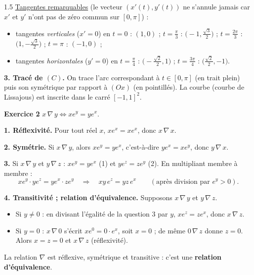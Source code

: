 \documentclass[12pt]{article}
\begin{document}
\begin{spacing}{1.5}
\underline{Tangentes remarquables} (le vecteur $(x'(t),y'(t))$ ne s'annule jamais car $x'$ et $y'$ n'ont pas de zéro commun sur $[0,\pi]$) :
\begin{itemize}
\item tangentes \emph{verticales} ($x'=0$) en $t=0$ : $(1,0)$ ; $t=\frac\pi3$ : $\big(-1,\frac{\sqrt3}2\big)$ ; $t=\frac{2\pi}3$ : $\big(1,-\frac{\sqrt3}2\big)$ ; $t=\pi$ : $(-1,0)$ ;
\item tangentes \emph{horizontales} ($y'=0$) en $t=\frac\pi4$ : $\big(-\frac{\sqrt2}2,1\big)$ ; $t=\frac{3\pi}4$ : $\big(\frac{\sqrt2}2,-1\big)$.
\end{itemize}

\textbf{3. Tracé de $(C)$.} On trace l'arc correspondant à $t\in[0,\pi]$ (en trait plein) puis son symétrique par rapport à $(Ox)$ (en pointillés). La courbe (courbe de Lissajous) est inscrite dans le carré $[-1,1]^2$.
\begin{center}
\end{center}

\medskip\textbf{Exercice 2} \quad $x\,\nabla\,y\iff xe^y=ye^x$.

\textbf{1. Réflexivité.} Pour tout réel $x$, $xe^x=xe^x$, donc $x\,\nabla\,x$.

\textbf{2. Symétrie.} Si $x\,\nabla\,y$, alors $xe^y=ye^x$, c'est-à-dire $ye^x=xe^y$, donc $y\,\nabla\,x$.

\textbf{3.} Si $x\,\nabla\,y$ et $y\,\nabla\,z$ : $xe^y=ye^x$ (1) et $ye^z=ze^y$ (2). En multipliant membre à membre :
\[
xe^y\cdot ye^z=ye^x\cdot ze^y\quad\Longrightarrow\quad xy\,e^z=yz\,e^x\qquad(\text{après division par } e^y>0).
\]

\textbf{4. Transitivité ; relation d'équivalence.} Supposons $x\,\nabla\,y$ et $y\,\nabla\,z$.
\begin{itemize}
\item Si $y\neq0$ : en divisant l'égalité de la question 3 par $y$, $xe^z=ze^x$, donc $x\,\nabla\,z$.
\item Si $y=0$ : $x\,\nabla\,0$ s'écrit $xe^0=0\cdot e^x$, soit $x=0$ ; de même $0\,\nabla\,z$ donne $z=0$. Alors $x=z=0$ et $x\,\nabla\,z$ (réflexivité).
\end{itemize}
La relation $\nabla$ est réflexive, symétrique et transitive : c'est une \textbf{relation d'équivalence}.


\end{spacing}
\end{document}
